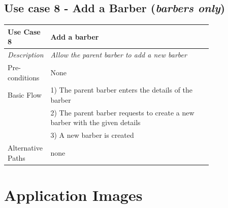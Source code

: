 \documentclass[12pt]{article}
\begin{document}
	\subsection{Use case 8 - Add a Barber (\emph{barbers only})}
	\label{chap:use-cases-8}
	\begin{table}[H]
		\begin{tabular}{|l|p{0.8\linewidth}}
			\hline
			\rowcolor[HTML]{EFEFEF} 
			\textbf{Use Case 8}  & \textbf{Add a barber}                                                       \\ \hline
			\rowcolor[HTML]{F5FBFF} 
			\textit{Description} & \textit{Allow the parent barber to add a new barber}                        \\ \hline
			\rowcolor[HTML]{EFEFEF} 
			Pre-conditions       & None                                                                        \\ \hline
			\rowcolor[HTML]{F5FBFF} 
			Basic Flow           & 1) The parent barber enters the details of the barber                       \\
			\rowcolor[HTML]{F5FBFF} 
			& 2) The parent barber requests to create a new barber with the given details \\
			\rowcolor[HTML]{F5FBFF} 
			& 3) A new barber is created                                                  \\ \hline
			\rowcolor[HTML]{EFEFEF} 
			Alternative Paths    & none                                                                       
		\end{tabular}
	\end{table}

	\pagebreak
	
	\section{Application Images}
	
\end{document}
